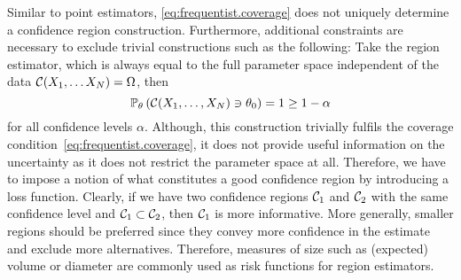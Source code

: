 Similar to point estimators, \cref{eq:frequentist.coverage} does not uniquely determine a confidence region construction.
Furthermore, additional constraints are necessary to exclude trivial constructions such as the following:
Take the region estimator, which is always equal to the full parameter space independent of the data $\mathcal{C}(X_1, \ldots X_N) = \Omega$, then
\[
  \mathbb{P}_\theta\left(  \mathcal{C}(X_1, \ldots, X_N) \ni \theta_0  \right) = 1 \ge 1 - \alpha
\]
for all confidence levels $\alpha$.
Although, this construction trivially fulfils the coverage condition~\eqref{eq:frequentist.coverage}, it does not provide useful information on the uncertainty as it does not restrict the parameter space at all.
Therefore, we have to impose a notion of what constitutes a good confidence region by introducing a loss function.
Clearly, if we have two confidence regions $\mathcal{C}_1$ and $\mathcal{C}_2$ with the same confidence level and $\mathcal{C}_1 \subset \mathcal{C}_2$, then $\mathcal{C}_1$ is more informative.
More generally, smaller regions should be preferred since they convey more confidence in the estimate and exclude more alternatives.
Therefore, measures of size such as (expected) volume or diameter are commonly used as risk functions for region estimators.


